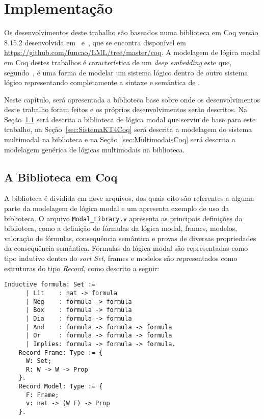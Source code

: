 \chapter{Implementação}
    \label{cap:Implementacao}
	  Os desenvolvimentos deste trabalho são baseados numa biblioteca em Coq versão 8.15.2 desenvolvida em~ e~,
    que se encontra disponível em \url{https://github.com/funcao/LML/tree/master/coq}.
	  A modelagem de lógica modal em Coq destes trabalhos é característica de um \textit{deep embedding} este que, segundo~,
	  é uma forma de modelar um sistema lógico  dentro de outro sistema lógico  representando completamente a
	  sintaxe e semântica de .

    Neste capítulo, será apresentada a biblioteca base sobre onde os desenvolvimentos deste trabalho foram feitos
	  e os próprios desenvolvimentos serão descritos. Na Seção~\ref{sec:ImplementacaoCoq} será descrita a biblioteca de lógica modal que
    serviu de base para este trabalho, na Seção~\ref{sec:SistemaKT4Coq} será descrita a modelagem do sistema
    multimodal \SisT na biblioteca e na Seção~\ref{sec:MultimodaisCoq} será descrita a modelagem genérica de lógicas multimodais na biblioteca.

    \section{A Biblioteca em Coq}
        \label{sec:ImplementacaoCoq}
        A biblioteca é dividida em nove arquivos, dos quais oito são referentes a alguma parte da modelagem de lógica modal e um apresenta
        exemplo de uso da biblioteca.
        O arquivo \texttt{Modal\_Library.v} apresenta as principais definições da biblioteca, como a definição de fórmulas
        da lógica modal, frames, modelos, valoração de fórmulas, consequência semântica e provas de diversas propriedades
        da consequência semântica.
        Fórmulas da lógica modal são representadas como tipo indutivo dentro do \textit{sort Set}, frames e modelos são representados
        como estruturas do tipo \textit{Record}, como descrito a seguir:
        \begin{lstlisting}[language=coq]
    Inductive formula: Set :=
      | Lit    : nat -> formula
      | Neg    : formula -> formula
      | Box    : formula -> formula
      | Dia    : formula -> formula
      | And    : formula -> formula -> formula
      | Or     : formula -> formula -> formula
      | Implies: formula -> formula -> formula.
    Record Frame: Type := {
      W: Set;
      R: W -> W -> Prop
    }.
    Record Model: Type := {
      F: Frame;
      v: nat -> (W F) -> Prop
    }.
        \end{lstlisting}

